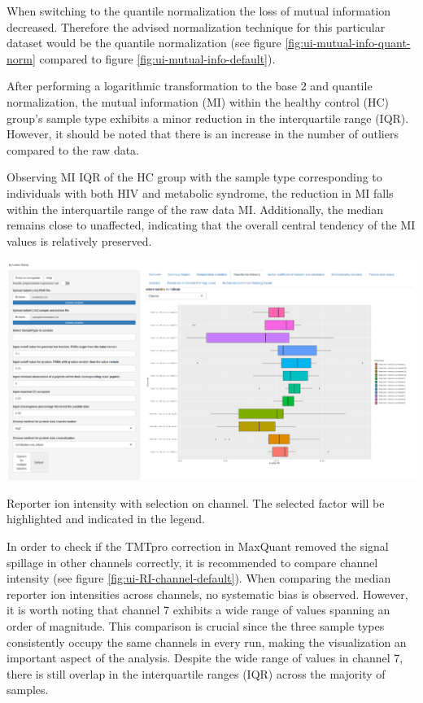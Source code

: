 \documentclass[
  11pt,
]{article}
\let\origfigure\figure
\begin{document}
When switching to the quantile normalization the loss of mutual information decreased. Therefore the advised normalization technique for this particular dataset would be the quantile normalization (see figure \ref{fig:ui-mutual-info-quant-norm} compared to figure \ref{fig:ui-mutual-info-default}).

After performing a logarithmic transformation to the base 2 and quantile normalization, the mutual information (MI) within the healthy control (HC) group's sample type exhibits a minor reduction in the interquartile range (IQR). However, it should be noted that there is an increase in the number of outliers compared to the raw data.

Observing MI IQR of the HC group with the sample type corresponding to individuals with both HIV and metabolic syndrome, the reduction in MI falls within the interquartile range of the raw data MI. Additionally, the median remains close to unaffected, indicating that the overall central tendency of the MI values is relatively preserved.

\newpage
\bgroup  \origfigure[H] 

{\centering \includegraphics[width=1\linewidth]{screenshots/RI_channel_default} 

}

\caption{Reporter ion intensity with selection on channel. The selected factor will be highlighted and indicated in the legend.}\label{fig:ui-RI-channel-default}
 \endfigure\egroup

In order to check if the TMTpro correction in MaxQuant removed the signal spillage in other channels correctly, it is recommended to compare channel intensity (see figure \ref{fig:ui-RI-channel-default}).
When comparing the median reporter ion intensities across channels, no systematic bias is observed. However, it is worth noting that channel 7 exhibits a wide range of values spanning an order of magnitude. This comparison is crucial since the three sample types consistently occupy the same channels in every run, making the visualization an important aspect of the analysis. Despite the wide range of values in channel 7, there is still overlap in the interquartile ranges (IQR) across the majority of samples.
\end{document}
